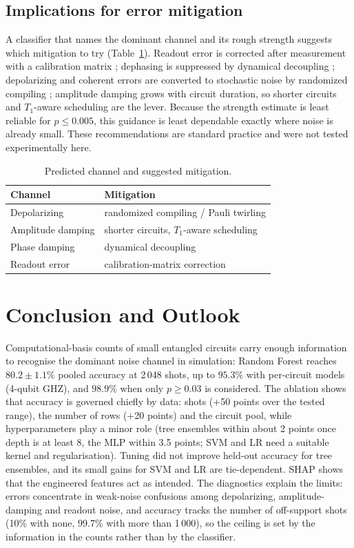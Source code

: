 \documentclass[conference]{IEEEtran}
\begin{document}
\subsection{Implications for error mitigation}\label{sec:mitig}
A classifier that names the dominant channel and its rough strength suggests which mitigation to try (Table~\ref{tab:mitig}). Readout error is corrected after measurement with a calibration matrix \cite{bravyi}; dephasing is suppressed by dynamical decoupling \cite{viola}; depolarizing and coherent errors are converted to stochastic noise by randomized compiling \cite{wallman}; amplitude damping grows with circuit duration, so shorter circuits and $T_1$-aware scheduling are the lever. Because the strength estimate is least reliable for $p\le0.005$, this guidance is least dependable exactly where noise is already small. These recommendations are standard practice and were not tested experimentally here.

\begin{table}[!t]
\caption{Predicted channel and suggested mitigation.}
\label{tab:mitig}
\centering\footnotesize
\begin{tabular}{@{}ll@{}}
\toprule
Channel & Mitigation\\
\midrule
Depolarizing & randomized compiling / Pauli twirling \cite{wallman}\\
Amplitude damping & shorter circuits, $T_1$-aware scheduling\\
Phase damping & dynamical decoupling \cite{viola}\\
Readout error & calibration-matrix correction \cite{bravyi}\\
\bottomrule
\end{tabular}
\end{table}

\section{Conclusion and Outlook}\label{sec:concl}
Computational-basis counts of small entangled circuits carry enough information to recognise the dominant noise channel in simulation: Random Forest reaches $80.2\pm1.1\%$ pooled accuracy at 2\,048 shots, up to $95.3\%$ with per-circuit models (4-qubit GHZ), and $98.9\%$ when only $p\ge0.03$ is considered. The ablation shows that accuracy is governed chiefly by data: shots (+50 points over the tested range), the number of rows (+20 points) and the circuit pool, while hyperparameters play a minor role (tree ensembles within about 2 points once depth is at least 8, the MLP within 3.5 points; SVM and LR need a suitable kernel and regularisation). Tuning did not improve held-out accuracy for tree ensembles, and its small gains for SVM and LR are tie-dependent. SHAP shows that the engineered features act as intended. The diagnostics explain the limits: errors concentrate in weak-noise confusions among depolarizing, amplitude-damping and readout noise, and accuracy tracks the number of off-support shots (10\% with none, 99.7\% with more than 1\,000), so the ceiling is set by the information in the counts rather than by the classifier.
\end{document}
